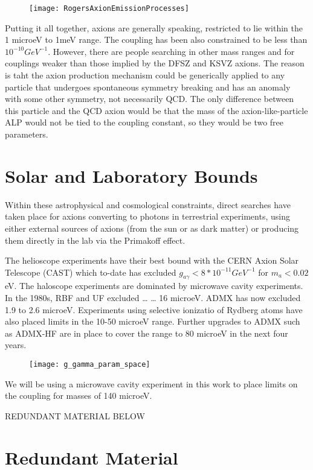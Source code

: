 \documentclass[11pt]{book}
\begin{document}
\begin{figure}
\texttt{[image: RogersAxionEmissionProcesses]}
\end{figure}

Putting it all together, axions are generally speaking, restricted to lie within the 1 microeV to 1meV range. The coupling has been also constrained to be less than $10^{-10} GeV^{-1}$. However, there are people searching in other mass ranges and for couplings weaker than those implied by the DFSZ and KSVZ axions. The reason is taht the axion production mechanism could be generically applied to any particle that undergoes spontaneous symmetry breaking and has an anomaly with some other symmetry, not necessarily QCD. The only difference between this particle and the QCD axion would be that the mass of the axion-like-particle ALP would not be tied to the coupling constant, so they would be two free parameters. 


\section{Solar and Laboratory Bounds}

Within these astrophysical and cosmological constraints, direct searches have taken place for axions converting to photons in terrestrial experiments, using either external sources of axions (from the sun or as dark matter) or producing them directly in the lab via the Primakoff effect.

The helioscope experiments have their best bound with the CERN Axion Solar Telescope (CAST) which to-date has excluded $g_{a\gamma} < 8 * 10^{-11} GeV^{-1}$ for $m_a < 0.02$ eV. The haloscope experiments are dominated by microwave cavity experiments. In the 1980s, RBF and UF excluded … … 16 microeV. ADMX has now excluded 1.9 to 2.6 microeV. Experiments using selective ionizatio of Rydberg atoms have also placed limits in the 10-50 microeV range. Further upgrades to ADMX such as ADMX-HF are in place to cover the range to 80 microeV in the next four years.

\begin{figure}
\texttt{[image: g\_gamma\_param\_space]}
\end{figure}

We will be using a microwave cavity experiment in this work to place limits on the coupling for masses of 140 microeV.

{\color{blue} REDUNDANT MATERIAL BELOW}

\section{Redundant Material}
\end{document}
